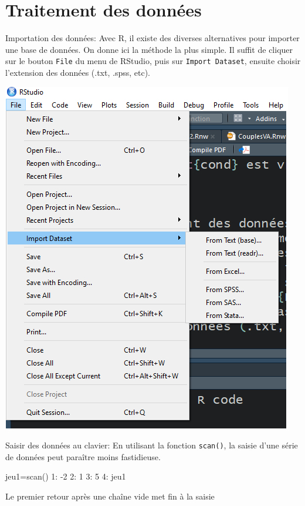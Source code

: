 \documentclass[
  8pt,
  ignorenonframetext,
]{beamer}
\newenvironment{Shaded}{\begin{snugshade}}{\end{snugshade}}
\newcommand{\DecValTok}[1]{\textcolor[rgb]{0.00,0.00,0.81}{#1}}
\newcommand{\FunctionTok}[1]{\textcolor[rgb]{0.00,0.00,0.00}{#1}}
\newcommand{\NormalTok}[1]{#1}
\newcommand{\OtherTok}[1]{\textcolor[rgb]{0.56,0.35,0.01}{#1}}
\newcommand{\SpecialCharTok}[1]{\textcolor[rgb]{0.00,0.00,0.00}{#1}}
\begin{document}
\hypertarget{traitement-des-donnuxe9es}{%
\section{Traitement des données}\label{traitement-des-donnuxe9es}}

\begin{frame}[fragile]{Importation des données:}
\protect\hypertarget{importation-des-donnuxe9es}{}
Avec R, il existe des diverses alternatives pour importer une base de
données. On donne ici la méthode la plus simple. Il suffit de cliquer
sur le bouton \texttt{File} du menu de RStudio, puis sur
\texttt{Import\ Dataset}, ensuite choisir l'extension des données (.txt,
.spss, etc).

\begin{center}\includegraphics[width=0.75\linewidth,height=0.7\textheight]{impD} \end{center}
\end{frame}

\begin{frame}[fragile]{Saisir des données au clavier:}
\protect\hypertarget{saisir-des-donnuxe9es-au-clavier}{}
En utilisant la fonction \texttt{scan()}, la saisie d'une série de
données peut paraître moins fastidieuse.

\begin{Shaded}
\begin{Highlighting}[]
\NormalTok{jeu1}\OtherTok{=}\FunctionTok{scan}\NormalTok{()}
\DecValTok{1}\SpecialCharTok{:} \SpecialCharTok{{-}}\DecValTok{2}
\DecValTok{2}\SpecialCharTok{:} \DecValTok{1}
\DecValTok{3}\SpecialCharTok{:} \DecValTok{5}
\DecValTok{4}\SpecialCharTok{:} 
\NormalTok{jeu1}
\end{Highlighting}
\end{Shaded}

Le premier retour après une chaîne vide met fin à la saisie
\end{frame}
\end{document}
